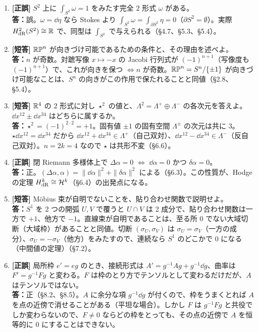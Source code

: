 \begin{enumerate}[label=\textbf{Q\arabic*.},leftmargin=2.6em,itemsep=5pt]
\item \textbf{[正誤]} $S^2$ 上に $\int_{S^2}\omega=1$ をみたす完全 $2$ 形式 $\omega$ がある。\\
\textbf{答：}誤。$\omega=\dd\eta$ なら Stokes より $\int_{S^2}\omega=\int_{\partial S^2}\eta=0$（$\partial S^2=\emptyset$）。実際 $H^2_{\rm dR}(S^2)\cong\mathbb R$ で、同型は $\int_{S^2}$ で与えられる（§4.7、§5.3、§5.4）。

\item \textbf{[短答]} $\mathbb{RP}^n$ が向きづけ可能であるための条件と、その理由を述べよ。\\
\textbf{答：}$n$ が奇数。対蹠写像 $x\mapsto-x$ の Jacobi 行列式が $(-1)^{n+1}$（写像度も $(-1)^{n+1}$）で、これが向きを保つ $\iff n$ が奇数。$\mathbb{RP}^n=S^n/\{\pm1\}$ が向きづけ可能なことは、$S^n$ の向きがこの作用で保たれることと同値（§2.8、§5.4）。

\item \textbf{[短答]} $\mathbb R^4$ の $2$ 形式に対し $\star^2$ の値と、$\Lambda^2=\Lambda^+\oplus\Lambda^-$ の各次元を答えよ。$\dd x^{12}\pm\dd x^{34}$ はどちらに属するか。\\
\textbf{答：}$\star^2=(-1)^{2\cdot2}=+1$。固有値 $\pm1$ の固有空間 $\Lambda^\pm$ の次元は共に $3$。$\star\dd x^{12}=\dd x^{34}$ だから $\dd x^{12}+\dd x^{34}\in\Lambda^+$（自己双対）、$\dd x^{12}-\dd x^{34}\in\Lambda^-$（反自己双対）。$n=2k=4$ なので $\star$ は共形不変（§6.6）。

\item \textbf{[正誤]} 閉 Riemann 多様体上で $\Delta\alpha=0$ $\iff$ $\dd\alpha=0$ かつ $\delta\alpha=0$。\\
\textbf{答：}正。$(\Delta\alpha,\alpha)=\|\dd\alpha\|^2+\|\delta\alpha\|^2$ による（§6.3）。この性質が、Hodge の定理 $H^k_{\rm dR}\cong\mathcal H^k$（§6.4）の出発点になる。

\item \textbf{[短答]} Möbius 束が自明でないことを、貼り合わせ関数で説明せよ。\\
\textbf{答：}$S^1$ を 2 つの開弧 $U,V$ で覆うと $U\cap V$ は 2 成分で、貼り合わせ関数は一方で $+1$、他方で $-1$。直線束が自明であることは、至る所 $0$ でない大域切断（大域枠）があることと同値。切断 $(\sigma_U,\sigma_V)$ は $\sigma_U=\sigma_V$（一方の成分）、$\sigma_U=-\sigma_V$（他方）をみたすので、連続なら $S^1$ のどこかで $0$ になる（中間値の定理）（§7.2）。

\item \textbf{[正誤]} 局所枠 $e'=eg$ のとき、接続形式は $A'=g^{-1}Ag+g^{-1}\dd g$、曲率は $F'=g^{-1}Fg$ と変わる。$F$ は枠のとり方でテンソルとして変わるだけだが、$A$ はテンソルではない。\\
\textbf{答：}正（§8.2、§8.5）。$A$ に余分な項 $g^{-1}\dd g$ が付くので、枠をうまくとれば $A$ を点の近傍で消せることがある（平坦な場合）。しかし $F$ は $g^{-1}Fg$ と共役でしか変わらないので、$F\ne0$ ならどの枠をとっても、その点の近傍で $A$ を恒等的に $0$ にすることはできない。


\end{enumerate}
